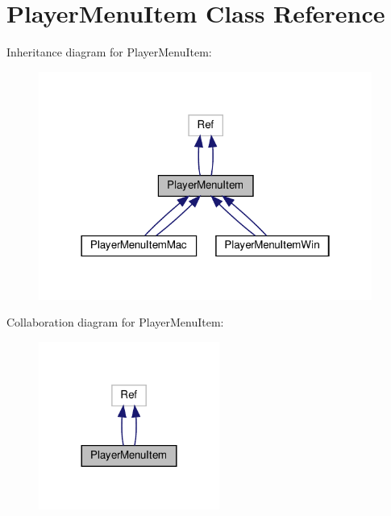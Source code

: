 \hypertarget{classPlayerMenuItem}{}\section{Player\+Menu\+Item Class Reference}
\label{classPlayerMenuItem}


Inheritance diagram for Player\+Menu\+Item\+:
\nopagebreak
\begin{figure}[H]
\begin{center}
\leavevmode
\includegraphics[width=310pt]{classPlayerMenuItem__inherit__graph}
\end{center}
\end{figure}


Collaboration diagram for Player\+Menu\+Item\+:
\nopagebreak
\begin{figure}[H]
\begin{center}
\leavevmode
\includegraphics[width=168pt]{classPlayerMenuItem__coll__graph}
\end{center}
\end{figure}
